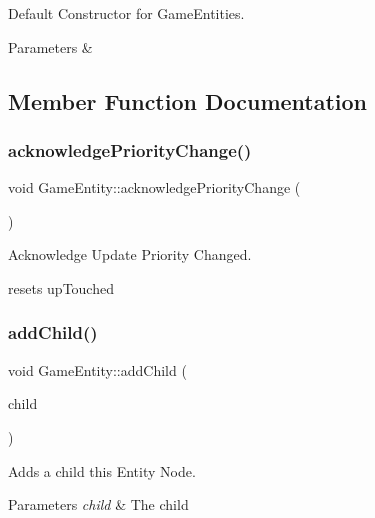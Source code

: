 Default Constructor for Game\+Entities. 


\begin{DoxyParams}{Parameters}
{\em } & \\
\hline
\end{DoxyParams}


\subsection{Member Function Documentation}
\mbox{\label{class_game_entity_a944913c4ecb2e4279831f2b4883b61d1}} 
\subsubsection{\texorpdfstring{acknowledgePriorityChange()}{acknowledgePriorityChange()}}
{\footnotesize\ttfamily void Game\+Entity\+::acknowledge\+Priority\+Change (\begin{DoxyParamCaption}{ }\end{DoxyParamCaption})\hspace{0.3cm}{\ttfamily [inline]}}



Acknowledge Update Priority Changed. 

resets up\+Touched \mbox{\label{class_game_entity_ae0dbd0aede5390f909e3d7d355d9b79a}} 
\subsubsection{\texorpdfstring{addChild()}{addChild()}}
{\footnotesize\ttfamily void Game\+Entity\+::add\+Child (\begin{DoxyParamCaption}\item[{\mbox{\hyperlink{class_game_entity}{Game\+Entity}} $\ast$}]{child }\end{DoxyParamCaption})\hspace{0.3cm}{\ttfamily [inline]}}



Adds a child this Entity Node. 


\begin{DoxyParams}{Parameters}
{\em child} & The child \\
\hline
\end{DoxyParams}
\mbox{\label{class_game_entity_a520a37644c64bfc71c31e26cbb9c4654}} 
